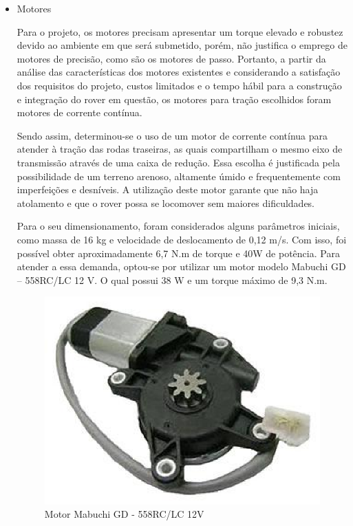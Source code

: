   \begin{itemize}
    \item Motores


 Para o projeto, os motores precisam apresentar um torque elevado e robustez devido ao ambiente em que será submetido, porém, não justifica o emprego de motores de precisão, como são os motores de passo. Portanto, a partir da análise das características dos motores existentes e considerando a satisfação dos requisitos do projeto, custos limitados e o tempo hábil para a construção e integração do rover em questão, os motores para tração escolhidos foram motores de corrente contínua.
 
 Sendo assim, determinou-se o uso de um motor de corrente contínua para atender à tração das rodas traseiras, as quais compartilham o mesmo eixo de transmissão através de uma caixa de redução. Essa escolha é justificada pela possibilidade de um terreno arenoso, altamente úmido e frequentemente com imperfeições e desníveis. A utilização deste motor garante que não haja atolamento e que o rover possa se locomover sem maiores dificuldades.
 
 Para o seu dimensionamento, foram considerados alguns parâmetros iniciais, como massa de 16 kg e velocidade de deslocamento de 0,12 m/s. Com isso, foi possível obter aproximadamente 6,7 N.m de torque e 40W de potência. Para atender a essa demanda, optou-se por utilizar um motor modelo Mabuchi GD – 558RC/LC 12 V. O qual possui 38 W e um torque máximo de 9,3 N.m.
 
 
      
       \begin{figure}[!htbp]
       	\begin{center}
       		\includegraphics[keepaspectratio=true,scale=1]{figuras/mabuchi.eps}
       		\caption{Motor Mabuchi GD - 558RC/LC 12V}
       	\end{center}
       \end{figure}
       

\end{itemize}
